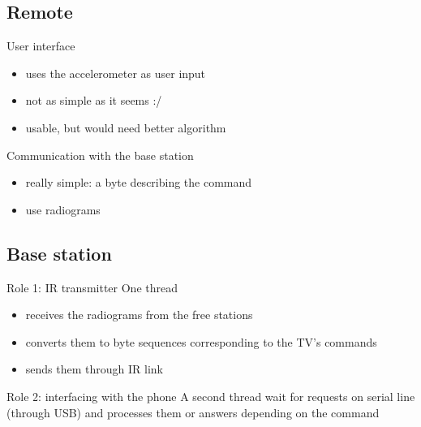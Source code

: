 \documentclass{beamer}
\begin{document}
\subsection{Remote}
\begin{frame}
  \begin{block}{User interface}
    \begin{itemize}
    \item uses the accelerometer as user input
    \item not as simple as it seems :/
    \item usable, but would need better algorithm
    \end{itemize}
  \end{block}
  \pause
  \begin{block}{Communication with the base station}
    \begin{itemize}
    \item really simple: a byte describing the command
    \item use radiograms
    \end{itemize}
  \end{block}
\end{frame}

\subsection{Base station}
\begin{frame}
  \begin{block}{Role 1: IR transmitter}
    One thread
    \begin{itemize}
    \item receives the radiograms from the free stations
    \item converts them to byte sequences corresponding to the TV's commands
    \item sends them through IR link
    \end{itemize}
  \end{block}

  \pause
  \begin{block}{Role 2: interfacing with the phone}
    A second thread wait for requests on serial line (through USB) and processes them or answers depending on the command
  \end{block}
\end{frame}
\end{document}
